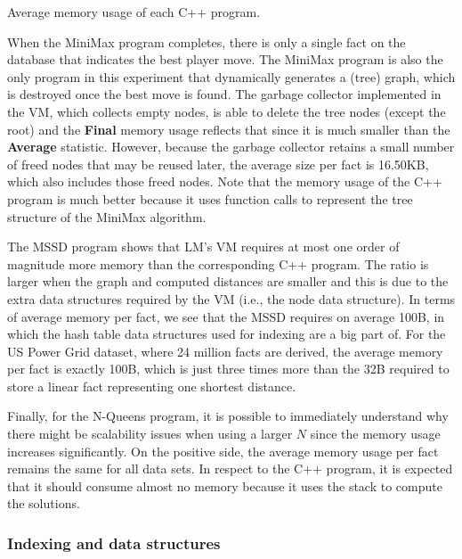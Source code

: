 \begin{table}[ht]
   \begin{center}
      
   \end{center}
   \caption{Average memory usage of each C++ program.}
   \label{table:implementation:cmem}
\end{table}

When the MiniMax program completes, there is only a single fact on the database
that indicates the best player move. The MiniMax program is also the only
program in this experiment that dynamically generates a (tree) graph, which is
destroyed once the best move is found. The garbage collector implemented in the
VM, which collects empty nodes, is able to delete the tree nodes (except the
root) and the \textbf{Final} memory usage reflects that since it is much smaller
than the \textbf{Average} statistic. However, because the garbage collector
retains a small number of freed nodes that may be reused later, the average size
per fact is 16.50KB, which also includes those freed nodes. Note that the memory
usage of the C++ program is much better because it uses function calls to
represent the tree structure of the MiniMax algorithm.

The MSSD program shows that LM's VM requires at most one order of magnitude more
memory than the corresponding C++ program. The ratio is larger when the graph
and computed distances are smaller and this is due to the extra data structures
required by the VM (i.e., the node data structure). In terms of average memory
per fact, we see that the MSSD requires on average 100B, in which the hash table
data structures used for indexing are a big part of. For the US Power Grid
dataset, where 24 million facts are derived, the average memory per fact is
exactly 100B, which is just three times more than the 32B required to store a
linear fact representing one shortest distance.

Finally, for the N-Queens program, it is possible to immediately understand why
there might be scalability issues when using a larger $N$ since the memory usage
increases significantly. On the positive side, the average memory usage per fact
remains the same for all data sets. In respect to the C++ program, it is
expected that it should consume almost no memory because it uses the stack to
compute the solutions.

\subsubsection{Indexing and data structures}

